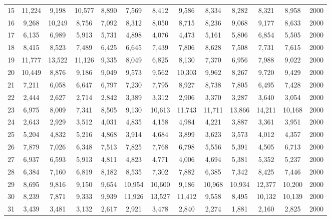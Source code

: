 {\begin{longtable}{ >{\footnotesize}ccccccccccccc}
15  & 11,224 & 9,198  & 10,577 & 8,890  & 7,569  & 8,412  & 9,586  & 8,334  & 8,282  & 8,321  & 8,958  & 2000 \\
16  & 9,268  & 10,249 & 8,756  & 7,092  & 8,312  & 8,050  & 8,715  & 8,236  & 9,068  & 9,177  & 8,633  & 2000 \\
17  & 6,135  & 6,989  & 5,913  & 5,731  & 4,898  & 4,076  & 4,473  & 5,161  & 5,806  & 6,854  & 5,505  & 2000 \\
18  & 8,415  & 8,523  & 7,489  & 6,425  & 6,645  & 7,439  & 7,806  & 8,628  & 7,508  & 7,731  & 7,615  & 2000 \\
19  & 11,777 & 13,522 & 11,126 & 9,335  & 8,049  & 6,825  & 8,130  & 7,370  & 6,956  & 7,988  & 9,022  & 2000 \\
20  & 10,449 & 8,876  & 9,186  & 9,049  & 9,573  & 9,562  & 10,303 & 9,962  & 8,267  & 9,720  & 9,429  & 2000 \\
21  & 7,211  & 6,058  & 6,647  & 6,797  & 7,230  & 7,795  & 8,927  & 8,738  & 7,805  & 6,495  & 7,428  & 2000 \\
22  & 2,444  & 2,627  & 2,714  & 2,842  & 3,389  & 3,312  & 2,906  & 3,370  & 3,287  & 3,640  & 3,054  & 2000 \\
23  & 6,975  & 8,009  & 7,341  & 8,505  & 9,130  & 10,613 & 11,743 & 11,711 & 13,866 & 14,211 & 10,168 & 2000 \\
24  & 2,643  & 2,929  & 3,512  & 4,031  & 4,835  & 4,158  & 4,984  & 4,221  & 3,887  & 3,361  & 3,951  & 2000 \\
25  & 5,204  & 4,832  & 5,216  & 4,868  & 3,914  & 4,684  & 3,899  & 3,623  & 3,573  & 4,012  & 4,357  & 2000 \\
26  & 7,879  & 7,026  & 6,348  & 7,513  & 7,825  & 7,768  & 6,798  & 5,556  & 5,391  & 4,505  & 6,713  & 2000 \\
27  & 6,937  & 6,593  & 5,913  & 4,811  & 4,823  & 4,771  & 4,006  & 4,694  & 5,381  & 5,352  & 5,237  & 2000 \\
28  & 6,384  & 7,160  & 6,819  & 8,182  & 8,535  & 7,302  & 7,882  & 6,385  & 7,342  & 8,425  & 7,446  & 2000 \\
29  & 8,695  & 9,816  & 9,150  & 9,654  & 10,954 & 10,600 & 9,186  & 10,968 & 10,934 & 12,377 & 10,200 & 2000 \\
30  & 8,239  & 7,871  & 9,333  & 9,939  & 11,926 & 13,527 & 11,412 & 9,558  & 8,495  & 10,132 & 10,139 & 2000 \\
31  & 3,439  & 3,481  & 3,132  & 2,617  & 2,921  & 3,478  & 2,840  & 2,274  & 1,881  & 2,160  & 2,825  & 2000 \\

\end{longtable}}

